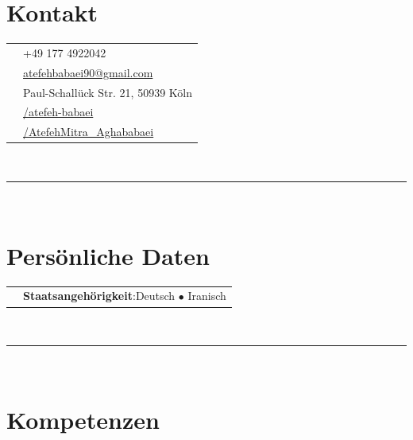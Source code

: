 \documentclass[oneside]{article}
\begin{document}
{\begin{minipage}[t][\textheight-2\fboxsep-2\fboxrule][t]{\dimexpr0.41\textwidth-2\fboxrule-2\fboxsep\relax}
        \section*{\large Kontakt}
        \begin{tabularx}{\textwidth}{@{}lX@{}} %
            \faPhone{}      & +49 177 4922042 \\
            \faEnvelope{}   & \href{mailto:atefehbabaei90@gmail.com}{atefehbabaei90@gmail.com} \\
            \faMapMarker{}  & {Paul-Schall\"uck Str. 21, 50939 K\"oln} \\
            \faLinkedin{} & \href{https://www.linkedin.com/in/atefeh-babaei/}{/atefeh-babaei} \\
            \faXing{}     & \href{https://www.xing.com/profile/AtefehMitra_Aghababaei}{/AtefehMitra\_Aghababaei} \\
        \end{tabularx}
        \vspace{4pt} \\
        \rule{\linewidth}{0.4pt} \\
        \section*{\large Pers\"onliche Daten}
        \begin{tabularx}{\textwidth}{@{}lX@{}} %
            \faFlag{}      & \textbf{\small Staatsangeh\"origkeit}:\newline Deutsch $\bullet$ Iranisch \\
            
        \end{tabularx}
        \vspace{2pt} \\
        \rule{\linewidth}{0.4pt} \\
        \section*{\large Kompetenzen}


\end{minipage}}
\end{document}
